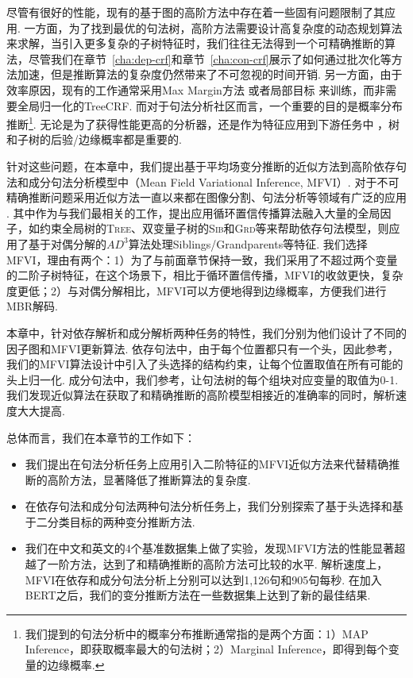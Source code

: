 尽管有很好的性能，现有的基于图的高阶方法中存在着一些固有问题限制了其应用.
一方面，为了找到最优的句法树，高阶方法需要设计高复杂度的动态规划算法来求解，当引入更多复杂的子树特征时，我们往往无法得到一个可精确推断的算法，尽管我们在章节~\ref{cha:dep-crf}和章节~\ref{cha:con-crf}展示了如何通过批次化等方法加速，但是推断算法的复杂度仍然带来了不可忽视的时间开销.
另一方面，由于效率原因，现有的工作通常采用Max Margin方法 \citep{mcdonald-pereira-2006-online}或者局部目标 \citep{ji-etal-2019-graph}来训练，而非需要全局归一化的TreeCRF.
而对于句法分析社区而言，一个重要的目的是概率分布推断\footnote{我们提到的句法分析中的概率分布推断通常指的是两个方面：1）MAP Inference，即获取概率最大的句法树；2）Marginal Inference，即得到每个变量的边缘概率.}.
无论是为了获得性能更高的分析器，还是作为特征应用到下游任务中 \citep{zhang-etal-2019-syntax,zhang-etal-2020-syntax}，树和子树的后验/边缘概率都是重要的.

针对这些问题，在本章中，我们提出基于平均场变分推断的近似方法到高阶依存句法和成分句法分析模型中（Mean Field Variational Inference, MFVI）.
对于不可精确推断问题采用近似方法一直以来都在图像分割、句法分析等领域有广泛的应用 \citep{krahenbuhl-etal-2011-efficient,wang-etal-2019-second,martins-etal-2011-dual}.
其中作为与我们最相关的工作，\citet{smith-eisner-2008-dependency,gormley-etal-2015-approximation}提出应用循环置信传播算法融入大量的全局因子，如约束全局树的\textsc{Tree}、双变量子树的\textsc{Sib}和\textsc{Grd}等来帮助依存句法模型，\citet{fonseca-martins-2020-revisiting}则应用了基于对偶分解的$AD^3$算法处理Siblings/Grandparents等特征.
我们选择MFVI，理由有两个：1）为了与前面章节保持一致，我们采用了不超过两个变量的二阶子树特征，在这个场景下，相比于循环置信传播，MFVI的收敛更快，复杂度更低；2）与对偶分解相比，MFVI可以方便地得到边缘概率，方便我们进行MBR解码.

本章中，针对依存解析和成分解析两种任务的特性，我们分别为他们设计了不同的因子图和MFVI更新算法.
依存句法中，由于每个位置都只有一个头，因此参考\citet{wang-tu-2020-second}，我们的MFVI算法设计中引入了头选择的结构约束，让每个位置取值在所有可能的头上归一化.
成分句法中，我们参考\citet{naradowsky-etal-2012-grammarless,wang-etal-2019-second,smith-eisner-2008-dependency}，让句法树的每个组块对应变量的取值为0-1.
我们发现近似算法在获取了和精确推断的高阶模型相接近的准确率的同时，解析速度大大提高.

总体而言，我们在本章节的工作如下：
\begin{itemize}
	\item 我们提出在句法分析任务上应用引入二阶特征的MFVI近似方法来代替精确推断的高阶方法，显著降低了推断算法的复杂度.
	\item 在依存句法和成分句法两种句法分析任务上，我们分别探索了基于头选择和基于二分类目标的两种变分推断方法.
	\item 我们在中文和英文的4个基准数据集上做了实验，发现MFVI方法的性能显著超越了一阶方法，达到了和精确推断的高阶方法可比较的水平.
	      解析速度上，MFVI在依存和成分句法分析上分别可以达到1,126句和905句每秒.
	      在加入BERT之后，我们的变分推断方法在一些数据集上达到了新的最佳结果.

\end{itemize}

